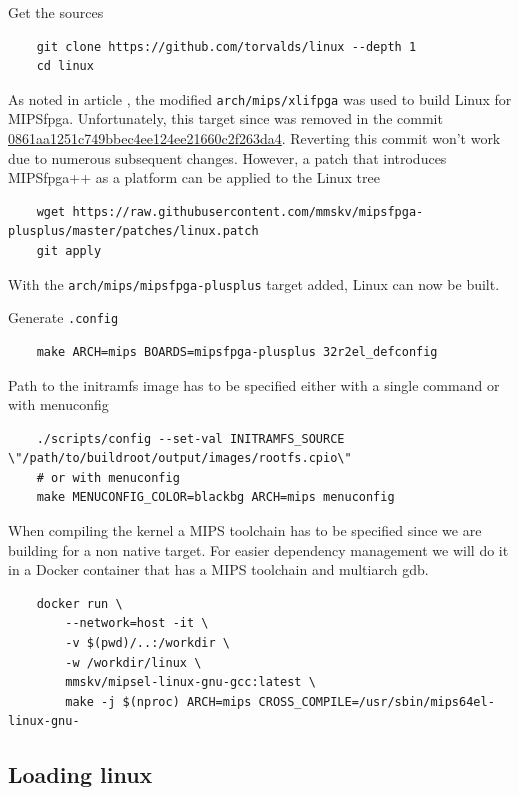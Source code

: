 \documentclass[a4paper]{article}
\let\oldtexttt\texttt
\renewcommand{\texttt}[1]{\textcolor{mygray}{\oldtexttt{#1}}}
\begin{document}
Get the sources

\begin{lstlisting}
    git clone https://github.com/torvalds/linux --depth 1
    cd linux
\end{lstlisting}

As noted in article \cite{mipsfpga_linux}, the modified
\texttt{arch/mips/xlifpga} was used to build Linux for MIPSfpga. Unfortunately,
this target since was removed in the commit
\href{https://github.com/torvalds/linux/commit/0861aa1251c749bbec4ee124ee21660c2f263da4}{0861aa1251c749bbec4ee124ee21660c2f263da4}.
Reverting this commit won't work due to numerous subsequent changes. However, a
patch that introduces MIPSfpga++ as a platform can be applied to the Linux tree

\begin{lstlisting}
    wget https://raw.githubusercontent.com/mmskv/mipsfpga-plusplus/master/patches/linux.patch
    git apply
\end{lstlisting}

With the \texttt{arch/mips/mipsfpga-plusplus} target added, Linux can now be built.

Generate \texttt{.config}

\begin{lstlisting}
    make ARCH=mips BOARDS=mipsfpga-plusplus 32r2el_defconfig
\end{lstlisting}

Path to the initramfs image has to be specified either with a single command or with menuconfig

\begin{lstlisting}
    ./scripts/config --set-val INITRAMFS_SOURCE \"/path/to/buildroot/output/images/rootfs.cpio\"
    # or with menuconfig
    make MENUCONFIG_COLOR=blackbg ARCH=mips menuconfig
\end{lstlisting}

When compiling the kernel a MIPS toolchain has to be specified since we are
building for a non native target. For easier dependency management we will do
it in a Docker container that has a MIPS toolchain and multiarch gdb.

\begin{lstlisting}
    docker run \
        --network=host -it \
        -v $(pwd)/..:/workdir \
        -w /workdir/linux \
        mmskv/mipsel-linux-gnu-gcc:latest \
        make -j $(nproc) ARCH=mips CROSS_COMPILE=/usr/sbin/mips64el-linux-gnu-
\end{lstlisting}

\subsection{Loading linux}
\end{document}
